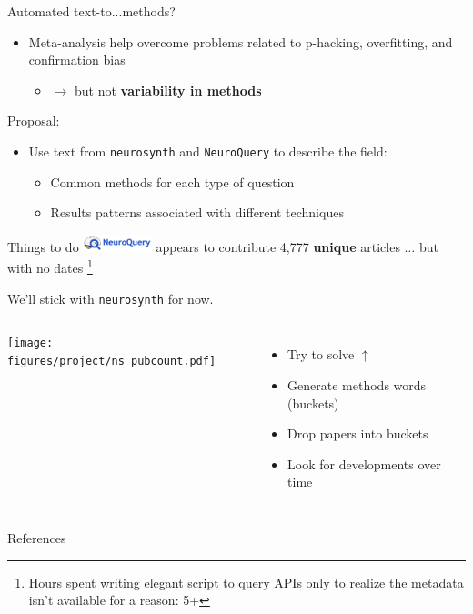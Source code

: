\documentclass[aspectratio=169]{beamer}
\begin{document}

\begin{frame}{Automated text-to...methods?}
	\begin{itemize}
		\item Meta-analysis help overcome problems related to p-hacking, overfitting, and confirmation bias
		\begin{itemize}
			\item $\rightarrow$ but not \textbf{variability in methods}
		\end{itemize}

	\end{itemize}
	
	\vspace{3mm}
	
	\pause
	Proposal:
	
	\begin{itemize}
		\item Use text from \texttt{neurosynth} and \texttt{NeuroQuery} to describe the field:
		\begin{itemize}
			\item Common methods for each type of question
			\item Results patterns associated with different techniques
		\end{itemize}
	\end{itemize}
\end{frame}


\begin{frame}{Things to do}
		\includegraphics[width=0.15\textwidth]{neuroquery}
		appears to contribute 4,777 \textbf{unique} articles $\ldots$ but with no dates \footnote[1]{%
		\tiny Hours spent writing elegant script to query APIs only to realize the metadata isn't available for a reason: 5+}
		
		\vspace{3mm}
		
		We'll stick with \texttt{neurosynth} for now.
		
		\begin{columns}
					\texttt{[image: figures/project/ns\_pubcount.pdf]}
					
				\begin{itemize}
					\item Try to solve $\uparrow$
					\item Generate methods words (buckets)
					\item Drop papers into buckets
					\item Look for developments over time
				\end{itemize}
		\end{columns}

\end{frame}



\begin{frame}[allowframebreaks]{References}

		\tiny
		

\end{frame}


	
	
\end{document}

